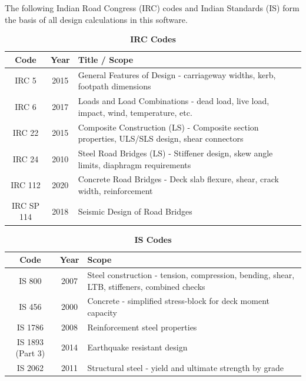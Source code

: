 \documentclass[12pt,a4paper]{report}
\numberwithin{table}{chapter}
\numberwithin{figure}{chapter}
\begin{document}
The following Indian Road Congress (IRC) codes and Indian Standards (IS) 
form the basis of all design calculations in this software.

\vspace{0.5cm}

\begingroup
\setlength{\tabcolsep}{3.5pt}
\begin{table}[H]
\caption{\textbf{IRC Codes}}
\begin{tabular}{|c|c|p{13cm}|}
\hline
\textbf{Code} & \textbf{Year} & \textbf{Title / Scope} \\ 
\hline
IRC 5 & 2015 & General Features of Design - carriageway widths, kerb, footpath dimensions \\ 
\hline
IRC 6 & 2017 & Loads and Load Combinations - dead load, live load, impact, wind, temperature, etc. \\ 
\hline
IRC 22 & 2015 & Composite Construction (LS) - Composite section properties, ULS/SLS design, shear connectors \\ 
\hline
IRC 24 & 2010 & Steel Road Bridges (LS) - Stiffener design, skew angle limits, diaphragm requirements \\ 
\hline
IRC 112 & 2020 & Concrete Road Bridges - Deck slab flexure, shear, crack width, reinforcement \\ 
\hline
IRC SP 114 & 2018 & Seismic Design of Road Bridges \\ 
\hline
\end{tabular}
\end{table}

\begingroup
\setlength{\tabcolsep}{3.5pt}
\begin{table}[H]
\caption{\textbf{IS Codes}}
\begin{tabular}{|c|c|p{13cm}|}
\hline
\textbf{Code} & \textbf{Year} & \textbf{Scope} \\
\hline
IS 800 & 2007 & Steel construction - tension, compression, bending, shear, LTB, stiffeners, combined checks \\
\hline
IS 456 & 2000 & Concrete - simplified stress-block for deck moment capacity \\
\hline
IS 1786 & 2008 & Reinforcement steel properties \\
\hline
IS 1893 (Part 3) & 2014 & Earthquake resistant design \\
\hline
IS 2062 & 2011 & Structural steel - yield and ultimate strength by grade \\
\hline
\end{tabular}
\end{table}
\end{document}
